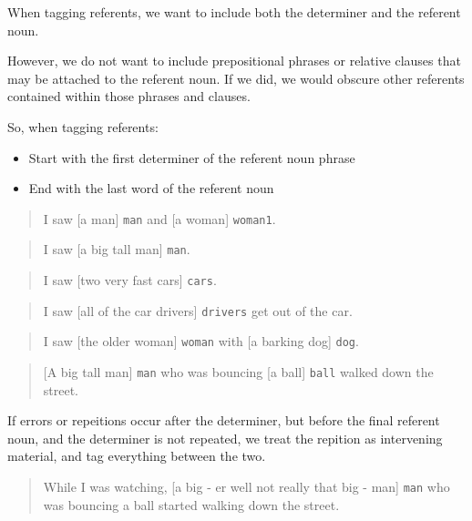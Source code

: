 \documentclass[
]{book}
\providecommand{\tightlist}{%
  \setlength{\itemsep}{0pt}\setlength{\parskip}{0pt}}
\begin{document}
When tagging referents,
we want to include both the determiner and the referent noun.

However,
we do not want to include prepositional phrases or relative clauses
that may be attached to the referent noun.
If we did, we would obscure other referents
contained within those phrases and clauses.

So, when tagging referents:

\begin{itemize}
\tightlist
\item
  Start with the first determiner of the referent noun phrase
\item
  End with the last word of the referent noun
\end{itemize}

\begin{quote}
I saw {[}a man{]} \texttt{man} and {[}a woman{]} \texttt{woman1}.
\end{quote}

\begin{quote}
I saw {[}a big tall man{]} \texttt{man}.
\end{quote}

\begin{quote}
I saw {[}two very fast cars{]} \texttt{cars}.
\end{quote}

\begin{quote}
I saw {[}all of the car drivers{]} \texttt{drivers} get out of the car.
\end{quote}

\begin{quote}
I saw {[}the older woman{]} \texttt{woman} with {[}a barking dog{]} \texttt{dog}.
\end{quote}

\begin{quote}
{[}A big tall man{]} \texttt{man}
who was bouncing {[}a ball{]} \texttt{ball} walked down the street.
\end{quote}

If errors or repeitions occur after the determiner,
but before the final referent noun,
and the determiner is not repeated,
we treat the repition as intervening material,
and tag everything between the two.

\begin{quote}
While I was watching,
{[}a big - er well not really that big - man{]} \texttt{man}
who was bouncing a ball started walking down the street.
\end{quote}
\end{document}
